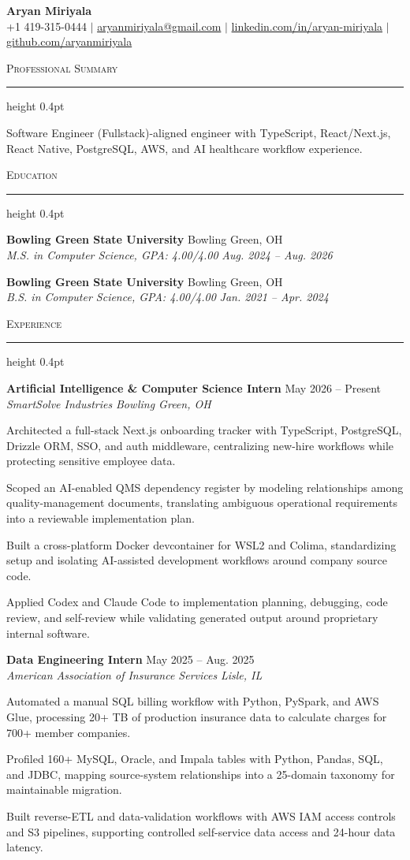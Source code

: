 \documentclass[letterpaper,11pt]{article}
\newcommand{\resumesection}[1]{%
  \par\vspace{2pt}%
  {\large\scshape #1}\par\vspace{2pt}%
  \hrule height 0.4pt\vspace{2pt}%
}
\newcommand{\resumeSubheading}[4]{
  \textbf{#1} \hfill #2\\
  \textit{#3} \hfill \textit{#4}
}
\begin{document}
\begin{center}
  {\LARGE \textbf{Aryan Miriyala}}\\[-1pt]
  \small
  +1 419-315-0444 $|$
  \href{mailto:aryanmiriyala@gmail.com}{aryanmiriyala@gmail.com} $|$
  \href{https://www.linkedin.com/in/aryan-miriyala-7788a21b6/}{linkedin.com/in/aryan-miriyala} $|$
  \href{https://github.com/aryanmiriyala}{github.com/aryanmiriyala}
\end{center}\vspace{-10pt}

\resumesection{Professional Summary}
Software Engineer (Fullstack)-aligned engineer with TypeScript, React/Next.js, React Native, PostgreSQL, AWS, and AI healthcare workflow experience.

\resumesection{Education}
\resumeSubheading
{Bowling Green State University}{Bowling Green, OH}
{M.S. in Computer Science, GPA: 4.00/4.00}{Aug. 2024 -- Aug. 2026}

\resumeSubheading
{Bowling Green State University}{Bowling Green, OH}
{B.S. in Computer Science, GPA: 4.00/4.00}{Jan. 2021 -- Apr. 2024}

\resumesection{Experience}
\resumeSubheading
{Artificial Intelligence \& Computer Science Intern}{May 2026 -- Present}
{SmartSolve Industries}{Bowling Green, OH}
\begin{tightitemize}
  \item Architected a full-stack Next.js onboarding tracker with TypeScript, PostgreSQL, Drizzle ORM, SSO, and auth middleware, centralizing new-hire workflows while protecting sensitive employee data.
  \item Scoped an AI-enabled QMS dependency register by modeling relationships among quality-management documents, translating ambiguous operational requirements into a reviewable implementation plan.
  \item Built a cross-platform Docker devcontainer for WSL2 and Colima, standardizing setup and isolating AI-assisted development workflows around company source code.
  \item Applied Codex and Claude Code to implementation planning, debugging, code review, and self-review while validating generated output around proprietary internal software.
\end{tightitemize}

\resumeSubheading
{Data Engineering Intern}{May 2025 -- Aug. 2025}
{American Association of Insurance Services}{Lisle, IL}
\begin{tightitemize}
  \item Automated a manual SQL billing workflow with Python, PySpark, and AWS Glue, processing 20+ TB of production insurance data to calculate charges for 700+ member companies.
  \item Profiled 160+ MySQL, Oracle, and Impala tables with Python, Pandas, SQL, and JDBC, mapping source-system relationships into a 25-domain taxonomy for maintainable migration.
  \item Built reverse-ETL and data-validation workflows with AWS IAM access controls and S3 pipelines, supporting controlled self-service data access and 24-hour data latency.
\end{tightitemize}
\end{document}
